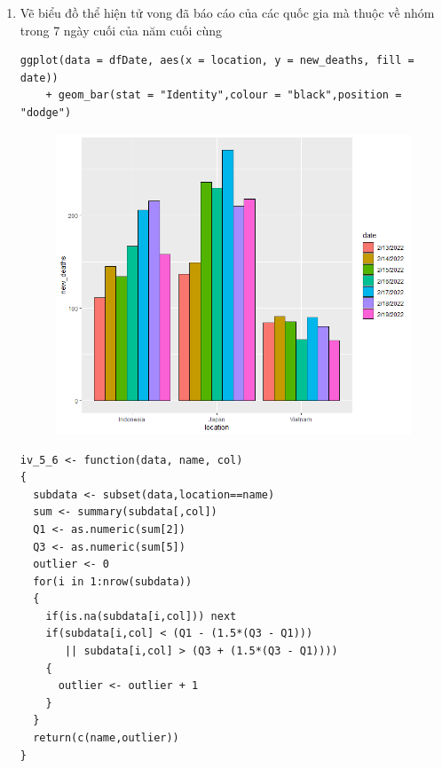 \documentclass[a4paper]{article}
\theoremstyle{definition}
\begin{document}
\begin{enumerate}[i)]
\begin{enumerate}[1)]
    \item Vẽ biểu đồ thể hiện tử vong đã báo cáo của các quốc gia  mà thuộc về nhóm trong 7 ngày cuối của năm cuối cùng
    \lstset{
    title=Source code}
\begin{lstlisting}[frame=single]  
ggplot(data = dfDate, aes(x = location, y = new_deaths, fill = date)) 
    + geom_bar(stat = "Identity",colour = "black",position = "dodge")
\end{lstlisting}
\begin{figure}[h!]
	\begin{center}
        \includegraphics[scale=0.8]{Images/IV/iv (4).png}
	\end{center}
\end{figure}
\newpage
\lstset{
    title=Function and Prep for iv5-6}
\begin{lstlisting}[frame=single]  
iv_5_6 <- function(data, name, col)
{
  subdata <- subset(data,location==name)
  sum <- summary(subdata[,col])
  Q1 <- as.numeric(sum[2])
  Q3 <- as.numeric(sum[5])
  outlier <- 0
  for(i in 1:nrow(subdata))
  {
    if(is.na(subdata[i,col])) next
    if(subdata[i,col] < (Q1 - (1.5*(Q3 - Q1))) 
       || subdata[i,col] > (Q3 + (1.5*(Q3 - Q1))))
    {
      outlier <- outlier + 1
    }
  }
  return(c(name,outlier))
}


\end{lstlisting}
\end{enumerate}
\end{enumerate}
\end{document}
